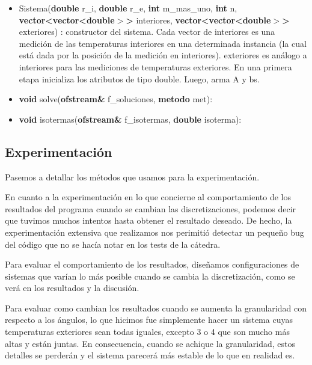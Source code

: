 \begin{itemize}
	\item Sistema(\textbf{double} r\_i,
					\textbf{double} r\_e,
          \textbf{int} m\_mas\_uno,
          \textbf{int} n,
          \textbf{vector<vector<double$>$>} interiores,
          \textbf{vector<vector<double$>$>} exteriores)	:
  		constructor del sistema. Cada vector de interiores es una medición de las temperaturas interiores en una determinada instancia (la cual está dada por la posición de la medición en interiores). exteriores es análogo a interiores para las mediciones de temperaturas exteriores. En una primera etapa inicializa los atributos de tipo double. Luego, arma A y bs.
          
  \item \textbf{void} solve(\textbf{ofstream\&} f\_soluciones, \textbf{metodo} met):

  \item \textbf{void} isotermas(\textbf{ofstream\&} f\_isotermas, \textbf{double} isoterma):

\end{itemize}

\subsection{Experimentación}

Pasemos a detallar los métodos que usamos para la experimentación.

En cuanto a la experimentación en lo que concierne al comportamiento de los resultados del programa cuando se cambian las discretizaciones, podemos decir que tuvimos muchos intentos hasta obtener el resultado deseado. De hecho, la experimentación extensiva que realizamos nos perimitió detectar un pequeño bug del código que no se hacía notar en los tests de la cátedra.

Para evaluar el comportamiento de los resultados, diseñamos configuraciones de sistemas que varían lo más posible cuando se cambia la discretización, como se verá en los resultados y la discusión.

Para evaluar como cambian los resultados cuando se aumenta la granularidad con respecto a los ángulos, lo que hicimos fue simplemente hacer un sistema cuyas temperaturas exteriores sean todas iguales, excepto 3 o 4 que son mucho más altas y están juntas. En consecuencia, cuando se achique la granularidad, estos detalles se perderán y el sistema parecerá más estable de lo que en realidad es.

